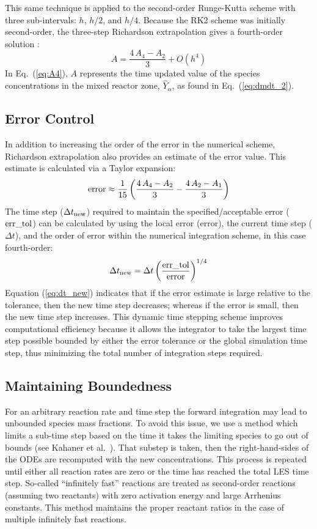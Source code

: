 This same technique is applied to the second-order Runge-Kutta scheme with three sub-intervals: $h$, $h/2$, and $h/4$. Because the RK2 scheme was initially second-order, the three-step Richardson extrapolation gives a fourth-order solution \cite{Moin:2001}:
\begin{equation}\label{eq:A4}
A=\frac{4\,A_4-A_2}{3}  + \mathit{O}(h^4)
\end{equation}
In Eq.~(\ref{eq:A4}), $A$ represents the time updated value of the species concentrations in the mixed reactor zone, $\hat{Y}_{\alpha}$, as found in Eq.~(\ref{eq:dmdt_2}).

\subsection*{Error Control}

In addition to increasing the order of the error in the numerical scheme, Richardson extrapolation also provides an estimate of the error value. This estimate is calculated via a Taylor expansion:
\begin{equation}\label{eq:error}
\hbox{error} \approx \frac{1}{15}\left(\frac{4\,A_4-A_2}{3} - \frac{4\,A_2-A_1}{3}\right)
\end{equation}
The time step ($\Delta t_{\rm new}$) required to maintain the specified/acceptable error ($\rm err\_tol$) can be calculated by using the local error (error), the current time step ($\Delta t$), and the order of error within the numerical integration scheme, in this case fourth-order:
\begin{equation}\label{eq:dt_new}
\Delta t_{\rm new}=\Delta t \left(\frac{\rm err\_tol}{\rm error}\right)^{1/4}
\end{equation}
Equation (\ref{eq:dt_new}) indicates that if the error estimate is large relative to the tolerance, then the new time step decreases; whereas if the error is small, then the new time step increases. This dynamic time stepping scheme improves computational efficiency because it allows the integrator to take the largest time step possible bounded by either the error tolerance or the global simulation time step, thus minimizing the total number of integration steps required.

\subsection*{Maintaining Boundedness}

For an arbitrary reaction rate and time step the forward integration may lead to unbounded species mass fractions.  To avoid this issue, we use a method which limits a sub-time step based on the time it takes the limiting species to go out of bounds (see Kahaner et al.~\cite{Kahaner:1989}).  That substep is taken, then the right-hand-sides of the ODEs are recomputed with the new concentrations.  This process is repeated until either all reaction rates are zero or the time has reached the total LES time step.  So-called ``infinitely fast'' reactions are treated as second-order reactions (assuming two reactants) with zero activation energy and large Arrhenius constants.  This method maintains the proper reactant ratios in the case of multiple infinitely fast reactions.

